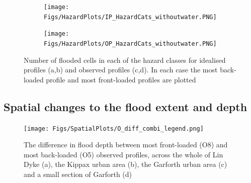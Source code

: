 \documentclass[APA,Times2COL]{WileyNJDv5}
\begin{document}
\begin{figure}[!t] 
\begin{subfigure}[H]{\linewidth}
\texttt{[image: Figs/HazardPlots/IP\_HazardCats\_withoutwater.PNG]}
\end{subfigure}
\begin{subfigure}[H]{\linewidth}
\texttt{[image: Figs/HazardPlots/OP\_HazardCats\_withoutwater.PNG]}
\end{subfigure}
 \caption{Number of flooded cells in each of the hazard classes for idealised profiles (a,b) and observed profiles (c,d). In each case the most back-loaded profile and most front-loaded profiles are plotted}\label{fig:hazard_plots} 
\end{figure}

\subsection{Spatial changes to the flood extent and depth}\label{subsec:model}
\begin{figure}[h!]
    \centering
 \texttt{[image: Figs/SpatialPlots/O\_diff\_combi\_legend.png]}    
 \vspace{-25pt}
   \caption{The difference in flood depth between most front-loaded (O8) and most back-loaded (O5) observed profiles, across the whole of Lin Dyke (a), the Kippax urban area (b), the Garforth urban area (c) and a small section of Garforth (d) }\label{fig:flooded_area_spatial_diff} 
\end{figure}
\end{document}
